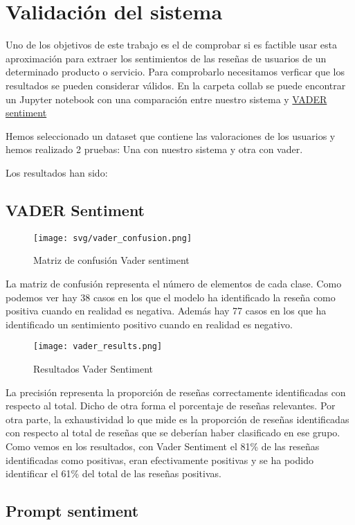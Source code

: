 \section{Validación del sistema}
Uno de los objetivos de este trabajo es el de comprobar si es factible usar esta aproximación 
para extraer los sentimientos de las reseñas de usuarios de un determinado producto o servicio.
Para comprobarlo necesitamos verficar que los resultados se pueden considerar válidos.
En la carpeta collab se puede encontrar un Jupyter notebook con una comparación entre nuestro sistema 
y \href{https://github.com/cjhutto/vaderSentiment}{VADER sentiment}

Hemos seleccionado un dataset que contiene las valoraciones de los usuarios y hemos realizado 2 pruebas:
Una con nuestro sistema y otra con vader.

Los resultados han sido:

\subsection{VADER Sentiment}

\begin{figure}[h]
   \advance{} 
   \texttt{[image: svg/vader\_confusion.png]}
   \caption{Matriz de confusión Vader sentiment}
\end{figure}

La matriz de confusión representa el número de elementos de cada clase.
Como podemos ver hay 38 casos en los que el modelo ha identificado la 
reseña como positiva cuando en realidad es negativa.
Además hay 77 casos en los que ha identificado un sentimiento positivo 
cuando en realidad es negativo.

\begin{figure}[h]
   \advance{} 
   \texttt{[image: vader\_results.png]}
   \caption{Resultados Vader Sentiment}
\end{figure}
La precisión representa la proporción de reseñas correctamente identificadas
con respecto al total. Dicho de otra forma el porcentaje de reseñas relevantes.
Por otra parte, la exhaustividad lo que mide es la proporción de reseñas 
identificadas con respecto al total de reseñas que se deberían haber 
clasificado en ese grupo.
Como vemos en los resultados, con Vader Sentiment el 81\% de las reseñas 
identificadas como positivas, eran efectivamente positivas y se ha podido identificar 
el 61\% del total de las reseñas positivas.

\newpage
\subsection{Prompt sentiment}

